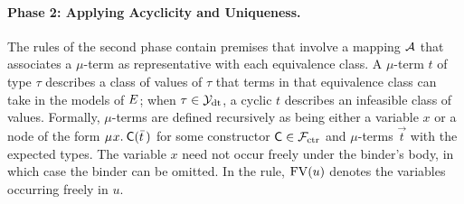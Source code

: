 \paragraph{Phase 2: Applying Acyclicity and Uniqueness.}
The rules of the second phase contain premises that involve a mapping $\mathcal{A}$
that associates a $\mu$-term as representative with each equivalence class.
A $\mu$-term $t$ of type $\tau$ describes a class of values of
$\tau$ that terms in that equivalence class can take in the models of $E$;
when $\tau \in \mathcal{Y}_{\mathrm{dt}}$, a cyclic $t$ describes an infeasible class of values.
Formally, $\mu$-terms are defined recursively as being either a variable $x$
or a node of the form
$\MU x.\: \const{C}( \vec t\, )$ for some constructor $\textsf{C} \in \mathcal{F}_{\mathrm{ctr}}$ and
$\mu$-terms $\vec t$ with the expected types.
The variable $x$ need not occur freely under the binder's body, in which case the
binder can be omitted.
In the  rule,
$\mathrm{FV}( u )$ denotes the variables occurring freely in $u$.

%


